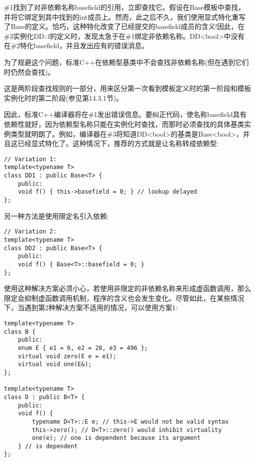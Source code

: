 \#1找到了对非依赖名称basefield的引用，立即查找它。假设在Base模板中查找，并将它绑定到其中找到的int成员上。然而，此之后不久，我们使用显式特化重写了Base的定义。恰巧，这种特化改变了已经提交的basefield成员的含义!因此，在\#3实例化DD::f的定义时，发现太急于在\#1绑定非依赖名称。DD<bool>中没有在\#2特化basefield，并且发出应有的错误消息。

为了规避这个问题，标准C++在依赖型基类中不会查找非依赖名称(但在遇到它们时仍然会查找)。

\begin{tcolorbox}[colback=webgreen!5!white,colframe=webgreen!75!black]
\hspace*{0.75cm}这是两阶段查找规则的一部分，用来区分第一次看到模板定义时的第一阶段和模板实例化时的第二阶段(参见第14.3.1节)。
\end{tcolorbox}

因此，标准C++编译器将在\#1发出错误信息。要纠正代码，使名称basefield具有依赖性就好，因为依赖型名称只能在实例化时查找，而那时必须查找的具体基类实例类型就明朗了。例如，编译器在\#3将知道DD<bool>的基类是Base<bool>，并且这已经显式特化了。这种情况下，推荐的方式就是让名称转成依赖型:

\begin{lstlisting}[style=styleCXX]
// Variation 1:
template<typename T>
class DD1 : public Base<T> {
	public:
	void f() { this->basefield = 0; } // lookup delayed
};
\end{lstlisting}

另一种方法是使用限定名引入依赖:

\begin{lstlisting}[style=styleCXX]
// Variation 2:
template<typename T>
class DD2 : public Base<T> {
	public:
	void f() { Base<T>::basefield = 0; }
};
\end{lstlisting}

使用这种解决方案必须小心，若使用非限定的非依赖名称来形成虚函数调用，那么限定会抑制虚函数调用机制，程序的含义也会发生变化。尽管如此，在某些情况下，当遇到第2种解决方案不适用的情况，可以使用方案1:

\begin{lstlisting}[style=styleCXX]
template<typename T>
class B {
	public:
	enum E { e1 = 6, e2 = 28, e3 = 496 };
	virtual void zero(E e = e1);
	virtual void one(E&);
};

template<typename T>
class D : public B<T> {
	public:
	void f() {
		typename D<T>::E e; // this->E would not be valid syntax
		this->zero(); // D<T>::zero() would inhibit virtuality
		one(e); // one is dependent because its argument
	} // is dependent
};
\end{lstlisting}


